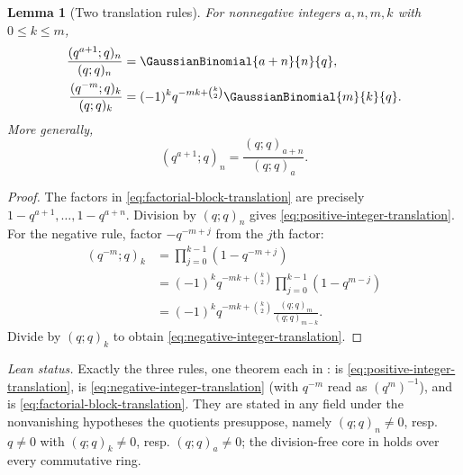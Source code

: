 \documentclass[11pt,a4paper,oneside,openany]{book}
\newtheorem{lemma}[lemma]{Lemma}
\theoremstyle{definition}
\theoremstyle{remark}
\begin{document}
\begin{lemma}[Two translation rules]\label{lem:integer-qpochhammer-translation}
For nonnegative integers $a,n,m,k$ with $0\le k\le m$,
\begin{align}
 \frac{(q^{a+1};q)_n}{(q;q)_n}
 &=\GaussianBinomial{a+n}{n}{q},
 \label{eq:positive-integer-translation}\\
 \frac{(q^{-m};q)_k}{(q;q)_k}
 &=(-1)^kq^{-mk+\binom k2}\GaussianBinomial{m}{k}{q}.
 \label{eq:negative-integer-translation}
\end{align}
More generally,
\begin{equation}\label{eq:factorial-block-translation}
 (q^{a+1};q)_n=\frac{(q;q)_{a+n}}{(q;q)_a}.
\end{equation}
\end{lemma}

\begin{proof}
The factors in \eqref{eq:factorial-block-translation} are precisely
$1-q^{a+1},\ldots,1-q^{a+n}$.  Division by $(q;q)_n$ gives
\eqref{eq:positive-integer-translation}.  For the negative rule, factor
$-q^{-m+j}$ from the $j$th factor:
\begin{align*}
 (q^{-m};q)_k
 &=\prod_{j=0}^{k-1}(1-q^{-m+j})\\
 &=(-1)^kq^{-mk+\binom k2}
   \prod_{j=0}^{k-1}(1-q^{m-j})\\
 &=(-1)^kq^{-mk+\binom k2}
   \frac{(q;q)_m}{(q;q)_{m-k}}.
\end{align*}
Divide by $(q;q)_k$ to obtain \eqref{eq:negative-integer-translation}.
\end{proof}
\emph{Lean status.}  Exactly the three rules, one theorem each in :  is \eqref{eq:positive-integer-translation},  is \eqref{eq:negative-integer-translation} (with \(q^{-m}\) read as \((q^{m})^{-1}\)), and  is \eqref{eq:factorial-block-translation}.  They are stated in any field under the nonvanishing hypotheses the quotients presuppose, namely \((q;q)_n\ne0\), resp. \(q\ne0\) with \((q;q)_k\ne0\), resp. \((q;q)_a\ne0\); the division-free core  in  holds over every commutative ring.
\end{document}
